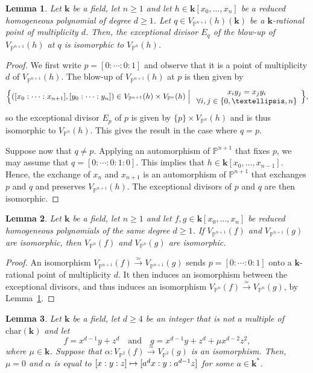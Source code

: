 \documentclass[11pt]{article}
\newcommand\mto{\mathchoice{\longmapsto}{\mapsto}{\mapsto}{\mapsto}}
\newcommand\quand{\quad\text{and}\quad}
\newtheorem{lemma}{Lemma}[section]
\theoremstyle{definition}
\newcommand\iso{\stackrel{\simeq}{\longrightarrow}}
\renewcommand\k{{\mathbf k}}
\newcommand\p{{\mathbb P}}\let\PP\p
\newcommand{\kk}{\mathbf{k}}
\newcommand{\Bigset}[2]{\Bigl\{#1 \Bigm| #2\Bigr\}}
\begin{document}
\begin{lemma}\label{Lem:ExcDivisorMultmax}
Let $\kk$ be a field, let $n\ge 1$ and let $h\in \kk[x_0,\ldots,x_n]$ be a reduced homogeneous polynomial of degree $d\ge 1$. Let $q\in V_{\p^{n+1}}(h)(\k)$ be a $\k$-rational point of multiplicity $d$. Then, the exceptional divisor $E_q$ of the blow-up of $V_{\p^{n+1}}(h)$ at $q$ is isomorphic to $V_{\p^{n}}(h)$.
\end{lemma}
\begin{proof}
We first write $p=[0:\cdots:0:1]$ and observe that it is a point of multiplicity $d$ of $V_{\p^{n+1}}(h)$. The blow-up of $V_{\p^{n+1}}(h)$ at $p$ is then given by
\[
\Bigset{([x_0:\cdots:x_{n+1}],[y_0:\cdots:y_n])\in V_{\p^{n+1}}(h)\times V_{\p^{n}}(h)}
{\begin{array}{c}
x_iy_j=x_jy_i \\
\forall i,j\in \{0,\ldots,n\}
\end{array}},
\]
so the exceptional divisor $E_p$ of $p$ is given by $\{p\} \times V_{\p^n}(h)$ and is thus isomorphic to $V_{\p^n}(h)$. This gives the result in the case where $q=p$.

Suppose now that $q\neq p$. Applying an automorphism of $\p^{n+1}$ that fixes $p$, we may assume that $q=[0:\cdots:0:1:0]$. This implies that $h\in \k[x_0,\ldots,x_{n-1}]$. Hence, the exchange of $x_n$ and $x_{n+1}$ is an automorphism of $\p^{n+1}$ that exchanges $p$ and $q$ and preserves $V_{\p^{n+1}}(h)$. The exceptional divisors of $p$ and $q$ are then isomorphic.
\end{proof}

\begin{lemma}\label{Lem:IsoHypNNplus}
Let $\kk$ be a field, let $n\ge 1$ and let $f,g\in \kk[x_0,\ldots,x_n]$ be reduced
homogeneous polynomials of the same degree $d\ge 1$. If $V_{\p^{n+1}}(f)$ and $V_{\p^{n+1}}(g)$ are isomorphic, then $V_{\p^{n}}(f)$ and $V_{\p^{n}}(g)$ are isomorphic.
\end{lemma}
\begin{proof}
An isomorphism $V_{\p^{n+1}}(f)\iso V_{\p^{n+1}}(g)$ sends $p=[0:\cdots:0:1]$ onto a $\k$-rational point of multiplicity $d$. It then induces an isomorphism between the exceptional divisors, and thus induces an isomorphism $V_{\p^{n}}(f)\iso V_{\p^{n}}(g)$, by Lemma~\ref{Lem:ExcDivisorMultmax}.
\end{proof}

\begin{lemma}\label{LemmCurveD}
Let $\kk$ be a field, let $d\ge 4$ be an integer that is not a multiple of $\mathrm{char}(\kk)$ and let
\[f=x^{d-1}y+z^{d} \quand g=x^{d-1}y+z^{d}+\mu x^{d-2}z^2,\]
where $\mu\in \k$. Suppose that $\alpha\colon V_{\p^2}(f)\iso V_{\p^2}(g)$ is an isomorphism. Then, $\mu=0$ and $\alpha$ is equal to $[x:y:z]\mto [a^d x:y:a^{d-1} z]$ for some $a\in \k^*$.
\end{lemma}
\end{document}
